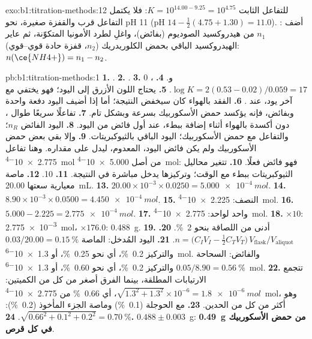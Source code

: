 \begin{solution}{exo:b1:titration-methods:12}
للتفاعل  الثابت $K = 10^{14.00 - 9.25} = 10^{4.75}$: فلا يكتمل
التفاعل قرب  والقفزة صغيرة،
نحو pH 11 (pH  $14 - \frac12(4.75 + 1.30) = 11.0$). : أضف $n_1$ من هيدروكسيد الصوديوم (بفائض)، واغلِ لطرد
الأمونيا المتكوّنة، ثم عاير الهيدروكسيد الباقي بحمض الكلوريدريك
($n_2$، قفزة حادة قوي--قوي): $n(\ce{NH4+}) = n_1 - n_2$.
\end{solution}

\begin{solution}{pb:b1:titration-methods:1}
\textbf{1.} .
\textbf{2.} .
\textbf{3.} 0 و.
\textbf{4.} ، $\log K = 2(0.53 - 0.02)/0.059
= 17$.
\textbf{5.} يحتاج اللون الأزرق إلى اليود؛ فهو يختفي مع آخر
يود، عند .
\textbf{6.} الفقد بالهواء كان سيخفض النتيجة؛ أما إذا أضيف اليود دفعة واحدة
وبفائض، فإنه يؤكسد حمض الأسكوربيك بسرعة وبشكل تام.
\textbf{7.} تفاعلًا سريعًا  طوال ،
دون أكسدة بالهواء أثناء إضافة  ببطء، 
عند أول فائض من اليود.
\textbf{8.} اليود الفائض $n_R$؛ والتفاعل مع حمض الأسكوربيك؛ 
اليود الباقي بالثيوكبريتات.
\textbf{9.} وإلا بقي بعض حمض الأسكوربيك ولم يكن فائض
اليود، المعدوم، ليدل على مقداره. وهنا
تفاعل \qty{2.775e-4}{mol} من أصل \qty{5.000e-4}{mol}: فهو فائض فعلًا.
\textbf{10.} تتغير محاليل الثيوكبريتات ببطء مع الوقت؛ وتركيزها
يدخل مباشرة في النتيجة.
\textbf{11.} 10.
\textbf{12.} ماصة معيارية سعتها \qty{20.00}{mL}.
\textbf{13.} $20.00 \times 10^{-3} \times 0.0250 = \qty{5.000e-4}{mol}$.
\textbf{14.} $8.90 \times 10^{-3} \times 0.0500 = \qty{4.450e-4}{mol}$.
\textbf{15.} النصف: \qty{2.225e-4}{mol}.
\textbf{16.} $5.000 - 2.225 = \qty{2.775e-4}{mol}$.
\textbf{17.} واحد لواحد: \qty{2.775e-4}{mol}.
\textbf{18.} $\times 10$: \qty{2.775e-3}{mol}، $\times 176.0$:
\qty{0.488}{g}.
\textbf{19.} أدنى من اللصاقة بنحو \qty{2}{\percent}.
\textbf{20.} $n = \bigl(C_IV_I - \frac12C_TV_T\bigr)\,V_{\mathrm{flask}}/V_{\mathrm{aliquot}}$.
\textbf{21.} اليود المُدخل: الماصة $0.03/20.00 = \qty{0.15}{\percent}$
والتركيز \qty{0.2}{\percent}، أي نحو \qty{0.25}{\percent}، أو
\qty{1.3e-6}{mol}. والفائض: السحاحة $0.05/8.90 = \qty{0.56}{\percent}$
والتركيز \qty{0.2}{\percent}، أي نحو \qty{0.60}{\percent}، أو
\qty{1.3e-6}{mol}.
\textbf{22.} تتجمع الارتيابات المطلقة، بينما الفرق
أصغر من كل من الكميتين: $\sqrt{1.3^2 + 1.3^2} \times 10^{-6} =
\qty{1.8e-6}{mol}$، أي \qty{0.66}{\percent} من \qty{2.775e-4}{mol}، وهو أكثر من
كل من الحدين.
\textbf{23.} مع الحوجلة (\qty{0.1}{\percent}) وماصة الجزء المأخوذ
(\qty{0.2}{\percent}): $\sqrt{0.66^2 + 0.1^2 + 0.2^2} = \qty{0.70}{\percent}$.
\textbf{24.} $0.488 \pm 0.003$~g: \textbf{\qty{0.49}{g} من حمض الأسكوربيك
في كل قرص}.
\end{solution}
